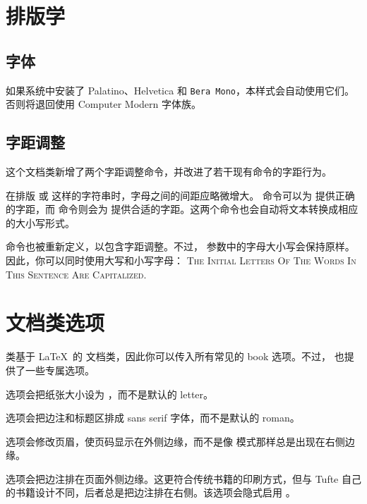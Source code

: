 \section{排版学}\label{sec:typography}

\subsection{字体}\label{sec:typefaces}
如果系统中安装了 Palatino、\textsf{Helvetica} 和 \texttt{Bera Mono}，本样式会自动使用它们。否则将退回使用 Computer Modern 字体族。

\subsection{字距调整}\label{sec:letterspacing}
这个文档类新增了两个字距调整命令，并改进了若干现有命令的字距行为。

在排版  或  这样的字符串时，字母之间的间距应略微增大。\cite[][p.32]{Bringhurst2005}  命令可以为  提供正确的字距，而  命令则会为  提供合适的字距。这两个命令也会自动将文本转换成相应的大小写形式。

 命令也被重新定义，以包含字距调整。不过， 参数中的字母大小写会保持原样。因此，你可以同时使用大写和小写字母：
\textsc{The Initial Letters Of The Words In This Sentence Are Capitalized.}



\section{文档类选项}\label{sec:options}

 类基于 \LaTeX\ 的  文档类，因此你可以传入所有常见的 book 选项。不过， 也提供了一些专属选项。

 选项会把纸张大小设为 ，而不是默认的  letter。

 选项会把边注和标题区排成 \textsf{sans serif} 字体，而不是默认的 roman。

 选项会修改页眉，使页码显示在外侧边缘，而不是像  模式那样总是出现在右侧边缘。

 选项会把边注排在页面外侧边缘。这更符合传统书籍的印刷方式，但与 Tufte 自己的书籍设计不同，后者总是把边注排在右侧。该选项会隐式启用 。

